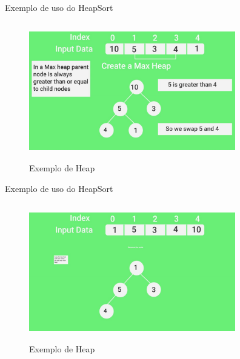 \begin{frame}
	\begin{block}{Exemplo de uso do HeapSort}
		\begin{figure}[!htb]
			\centering	  				
			\includegraphics[height=6cm, width = 9cm]{./pic/scene01297.jpg}
			\caption{Exemplo de Heap \cite{GEEKS_2018}}
		\end{figure}
	\end{block}
\end{frame}

\begin{frame}
	\begin{block}{Exemplo de uso do HeapSort}
		\begin{figure}[!htb]
			\centering	  				
			\includegraphics[height=6cm, width = 9cm]{./pic/scene01513.jpg}
			\caption{Exemplo de Heap \cite{GEEKS_2018}}
		\end{figure}
	\end{block}
\end{frame}

